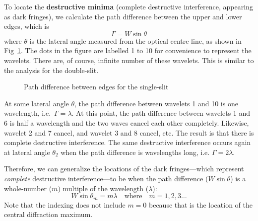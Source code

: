 To locate the \textbf{destructive minima} (complete destructive interference,
appearing as dark fringes), we calculate the path difference between the upper
and lower edges, which is
\begin{equation*}
  \Gamma=W\sin\theta
\end{equation*}
where $\theta$ is the lateral angle measured from the optical centre line,
as shown in Fig~\ref{fig:single-slit-path difference}. The dots in the figure
are labelled 1 to 10 for convenience to represent the wavelets. There are,
of course, infinite number of these wavelets. This is similar to the analysis
for the double-slit.
\begin{figure}[ht]
  \centering
  \caption{Path difference between edges for the single-slit}
  \label{fig:single-slit-path difference}
\end{figure}

At some lateral angle $\theta$, the path difference between wavelets 1 and 10
is one wavelength, i.e.\ $\Gamma=\lambda$. At this point, the path difference
between wavelets 1 and 6 is half a wavelength and the two waves cancel each
other completely. Likewise, wavelet 2 and 7 cancel, and wavelet 3 and 8 cancel,
etc. The result is that there is complete destructive interference. The same
destructive interference occurs again at lateral angle $\theta_2$ when the path
difference is wavelengths long, i.e. $\Gamma=2\lambda$.

Therefore, we can generalize the locations of the dark fringes---which represent
\emph{complete} destructive interference---to be when the path difference
($W\sin\theta$) is a whole-number ($m$) multiple of the wavelength ($\lambda$):
\begin{equation}
  \boxed{    
    W\sin\theta_m = m\lambda
  }
  \quad\text{where}\quad m=1,2,3\ldots
  \label{eq:1-slit-dark-fringe}
\end{equation}
Note that the indexing does not include $m=0$ because that is the location of
the central diffraction maximum.

